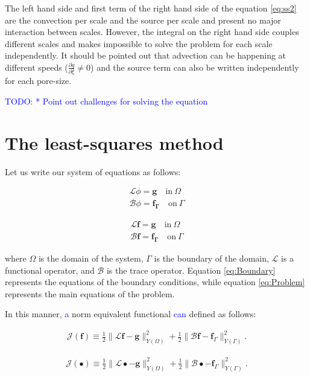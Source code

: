 \documentclass{CFD2011}
\newcommand{\TODO}[1]{\textcolor{blue}{TODO: #1} \\}
\newcommand{\Pablo}[1]{\textcolor{blue}{#1}}
\begin{document}
The left hand side and first term of the right hand side of the equation \ref{eq:ss2} are the convection per scale and the source per scale and present no major interaction between scales. However, the integral on the right hand side couples different scales and makes impossible to solve the problem for each scale independently. It should be pointed out that advection can be happening at different speeds ($\tfrac{\partial q}{\partial \xi} \neq 0$) and the source term can also be written independently for each pore-size.

\TODO{    * Point out challenges for solving the equation}

\section{The least-squares method}
Let us write our system of equations as follows:

\begin{eqnarray}
\mathcal{L} \phi = \mathbf{g} \quad \mbox{in} \ \Omega \label{eq:Problem} \\
\mathcal{B} \phi = \mathbf{f_\Gamma} \quad \mbox{on} \ \Gamma \label{eq:Boundary}
\end{eqnarray}

\begin{eqnarray}
\mathcal{L} \mathbf{f} = \mathbf{g} \quad \mbox{in} \ \Omega \label{eq:Problem} \\
\mathcal{B} \mathbf{f} = \mathbf{f_\Gamma} \quad \mbox{on} \ \Gamma \label{eq:Boundary}
\end{eqnarray}

\noindent where $\Omega$ is the domain of the system, $\Gamma$ is the boundary of the domain, $\mathcal{L}$ is a functional operator, and $\mathcal{B}$ is the trace operator. Equation \ref{eq:Boundary} represents the equations of the boundary conditions, while  equation \ref{eq:Problem} represents the main equations of the problem. 

In this manner, \Pablo{a} norm equivalent functional \Pablo{can} defined as follows:

\begin{eqnarray} 
\mathcal{J}(\mathbf{f})\equiv  \frac{1}{2}\parallel \mathcal{L} \mathbf{f} -\mathbf{g} \parallel_{Y(\Omega)}^2 + \frac{1}{2} \parallel \mathcal{B}\mathbf{f} - \mathbf{f}_{\Gamma} \parallel_{Y(\Gamma)}^2. 
\label{eq:WeakLSQ}
\end{eqnarray}


\begin{eqnarray} 
\mathcal{J}(\mathbf{\bullet})\equiv  \frac{1}{2}\parallel \mathcal{L} \bullet -\mathbf{g} \parallel_{Y(\Omega)}^2 + \frac{1}{2} \parallel \mathcal{B}\bullet - \mathbf{f}_{\Gamma} \parallel_{Y(\Gamma)}^2. 
\label{eq:WeakLSQ3}
\end{eqnarray}
\end{document}
